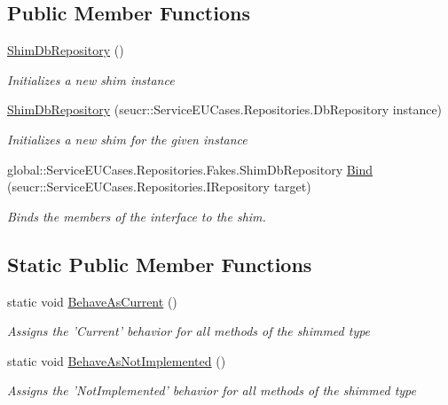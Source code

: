 \subsection*{Public Member Functions}
\begin{DoxyCompactItemize}
\item 
\hyperlink{class_service_e_u_cases_1_1_repositories_1_1_fakes_1_1_shim_db_repository_a13c88d55e9cec3e4ee6352dda7a3ebaf}{Shim\-Db\-Repository} ()
\begin{DoxyCompactList}\small\item\em Initializes a new shim instance\end{DoxyCompactList}\item 
\hyperlink{class_service_e_u_cases_1_1_repositories_1_1_fakes_1_1_shim_db_repository_a6e18fe7d4e89ad91207d78f1a7c0459f}{Shim\-Db\-Repository} (seucr\-::\-Service\-E\-U\-Cases.\-Repositories.\-Db\-Repository instance)
\begin{DoxyCompactList}\small\item\em Initializes a new shim for the given instance\end{DoxyCompactList}\item 
global\-::\-Service\-E\-U\-Cases.\-Repositories.\-Fakes.\-Shim\-Db\-Repository \hyperlink{class_service_e_u_cases_1_1_repositories_1_1_fakes_1_1_shim_db_repository_a7788733dec04347d7ffd945c5c2667c5}{Bind} (seucr\-::\-Service\-E\-U\-Cases.\-Repositories.\-I\-Repository target)
\begin{DoxyCompactList}\small\item\em Binds the members of the interface to the shim.\end{DoxyCompactList}\end{DoxyCompactItemize}
\subsection*{Static Public Member Functions}
\begin{DoxyCompactItemize}
\item 
static void \hyperlink{class_service_e_u_cases_1_1_repositories_1_1_fakes_1_1_shim_db_repository_a1e31aeec35f699f1a7603653a5494285}{Behave\-As\-Current} ()
\begin{DoxyCompactList}\small\item\em Assigns the 'Current' behavior for all methods of the shimmed type\end{DoxyCompactList}\item 
static void \hyperlink{class_service_e_u_cases_1_1_repositories_1_1_fakes_1_1_shim_db_repository_ab1b3a51bddca1c68318467129ae6189b}{Behave\-As\-Not\-Implemented} ()
\begin{DoxyCompactList}\small\item\em Assigns the 'Not\-Implemented' behavior for all methods of the shimmed type\end{DoxyCompactList}\end{DoxyCompactItemize}
